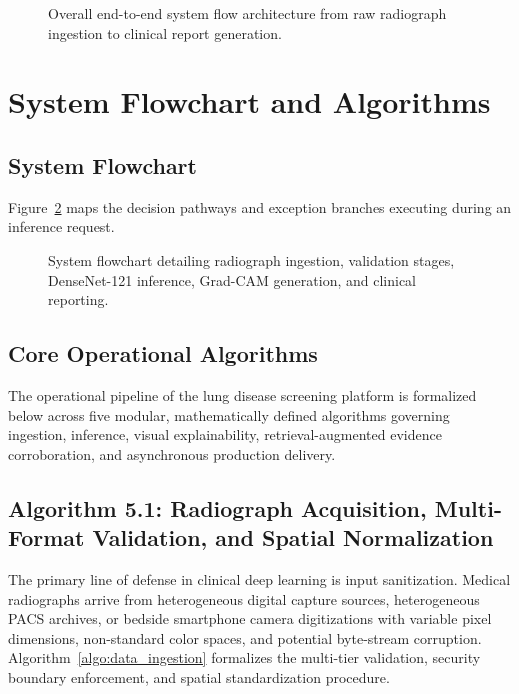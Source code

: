 \documentclass[12pt,a4paper]{report}
\begin{document}
\begin{figure}[H]
    \centering
    \caption{Overall end-to-end system flow architecture from raw radiograph ingestion to clinical report generation.}
    \label{fig:system_flow}
\end{figure}

\section{System Flowchart and Algorithms}

\subsection{System Flowchart}
Figure~\ref{fig:multiagent_flowchart} maps the decision pathways and exception branches executing during an inference request.

\begin{figure}[H]
    \centering
    \caption{System flowchart detailing radiograph ingestion, validation stages, DenseNet-121 inference, Grad-CAM generation, and clinical reporting.}
    \label{fig:multiagent_flowchart}
\end{figure}

\subsection{Core Operational Algorithms}
The operational pipeline of the lung disease screening platform is formalized below across five modular, mathematically defined algorithms governing ingestion, inference, visual explainability, retrieval-augmented evidence corroboration, and asynchronous production delivery.

\subsection{Algorithm 5.1: Radiograph Acquisition, Multi-Format Validation, and Spatial Normalization}
The primary line of defense in clinical deep learning is input sanitization. Medical radiographs arrive from heterogeneous digital capture sources, heterogeneous PACS archives, or bedside smartphone camera digitizations with variable pixel dimensions, non-standard color spaces, and potential byte-stream corruption. Algorithm~\ref{algo:data_ingestion} formalizes the multi-tier validation, security boundary enforcement, and spatial standardization procedure.
\end{document}
